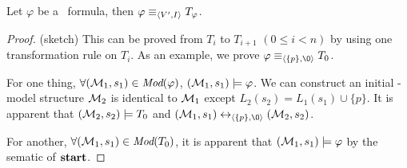 \documentclass{article}
\begin{document}
\begin{proposition}\label{pro:TranE}
 Let $\varphi$ be a \CTL\ formula, then $\varphi \equiv_{{\langle{V', I}\rangle}} T_{\varphi}$.
\end{proposition}
\begin{proof} (sketch)
This can be proved from $T_i$ to $T_{i+1}$ $(0\leq i < n)$ by using one transformation rule on $T_i$.
As an example, we prove $\varphi \equiv_{\tuple{\{p\}, {\O}}} T_0$.

For one thing, $\forall ({\cal M}_1,s_1) \in \textit{Mod}(\varphi)$, \ie $({\cal M}_1,s_1) \models \varphi$. We can construct an initial \Ind-model structure ${\cal M}_2$ is identical to ${\cal M}_1$ except $L_2(s_2) = L_1(s_1) \cup \{p\}$. It is apparent that $({\cal M}_2,s_2) \models T_0$ and $(\Hm_1, s_1) \lrto_{\tuple{\{p\}, {\O}}} (\Hm_2, s_2)$.

For another, $\forall ({\cal M}_1,s_1) \in \textit{Mod}(T_0)$, it is apparent that $({\cal M}_1,s_1) \models \varphi$ by the sematic of $\textbf{start}$.

%


\end{proof}
\end{document}
